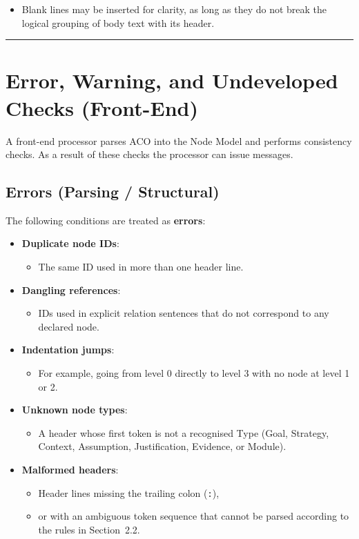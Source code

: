 \documentclass[11pt]{article}
\begin{document}
\begin{itemize}[leftmargin=2em]
  \item Blank lines may be inserted for clarity, as long as they do not break the logical grouping of body text with its header.
\end{itemize}

\bigskip
\hrule
\bigskip

\section{Error, Warning, and Undeveloped Checks (Front-End)}
\label{sec:errors}

A front-end processor parses ACO into the Node Model and performs consistency checks.
As a result of these checks the processor can issue messages.

\subsection{Errors (Parsing / Structural)}

The following conditions are treated as \textbf{errors}:

\begin{itemize}[leftmargin=2em]
  \item \textbf{Duplicate node IDs}:
  \begin{itemize}[leftmargin=1.5em]
    \item The same ID used in more than one header line.
  \end{itemize}

  \item \textbf{Dangling references}:
  \begin{itemize}[leftmargin=1.5em]
    \item IDs used in explicit relation sentences that do not correspond to any declared node.
  \end{itemize}

  \item \textbf{Indentation jumps}:
  \begin{itemize}[leftmargin=1.5em]
    \item For example, going from level 0 directly to level 3 with no node at level 1 or 2.
  \end{itemize}

  \item \textbf{Unknown node types}:
  \begin{itemize}[leftmargin=1.5em]
    \item A header whose first token is not a recognised Type (Goal, Strategy, Context, Assumption, Justification, Evidence, or Module).
  \end{itemize}

  \item \textbf{Malformed headers}:
  \begin{itemize}[leftmargin=1.5em]
    \item Header lines missing the trailing colon (\texttt{:}),
    \item or with an ambiguous token sequence that cannot be parsed according to the rules in Section~2.2.
  \end{itemize}
\end{itemize}
\end{document}
